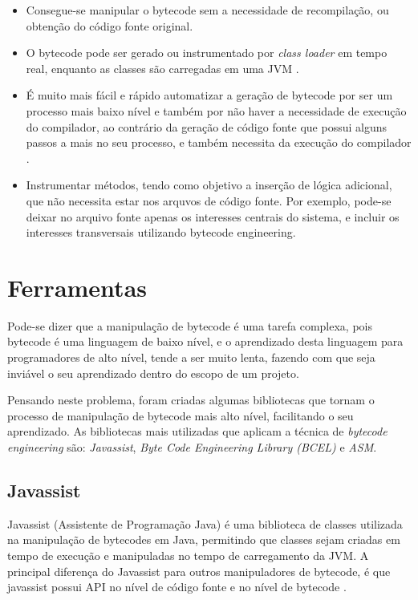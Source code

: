 \documentclass[tc,openright]{iiufrgs}
\begin{document}
\begin{itemize}
\item Consegue-se manipular o bytecode sem a necessidade de recompilação, ou obtenção do código fonte original.
\item O bytecode pode ser gerado ou instrumentado por \textit{class loader} em tempo real, enquanto as classes são carregadas em uma JVM \cite{kalinovsky2004covert}.
\item É muito mais fácil e rápido automatizar a geração de bytecode por ser um processo mais baixo nível e também por não haver a necessidade de execução do compilador, ao contrário da geração de código fonte que possui alguns passos a mais no seu processo, e também necessita da execução do compilador \cite{kalinovsky2004covert}.
\item Instrumentar métodos, tendo como objetivo a inserção de lógica adicional, que não necessita estar nos arquvos de código fonte. Por exemplo, pode-se deixar no arquivo fonte apenas os interesses centrais do sistema, e incluir os interesses transversais utilizando bytecode engineering. 
\end{itemize}

\section{Ferramentas}

Pode-se dizer que a manipulação de bytecode é uma tarefa complexa, pois bytecode é uma linguagem de baixo nível, e o aprendizado desta linguagem para programadores de alto nível, tende a ser muito lenta, fazendo com que seja inviável o seu aprendizado dentro do escopo de um projeto.

Pensando neste problema, foram criadas algumas bibliotecas que tornam o processo de manipulação de bytecode mais alto nível, facilitando o seu aprendizado. As bibliotecas mais utilizadas que aplicam a técnica de \textit{bytecode engineering} são: \textit{Javassist}, \textit{Byte Code Engineering Library (BCEL)} e \textit{ASM}.

\subsection {Javassist}

Javassist (Assistente de Programação Java) é uma biblioteca de classes utilizada na manipulação de bytecodes em Java, permitindo que classes sejam criadas em tempo de execução e manipuladas no tempo de carregamento da JVM. A principal diferença do Javassist para outros manipuladores de bytecode, é que javassist possui  API no nível de código fonte e no nível de bytecode \cite{javassist}.
\end{document}
